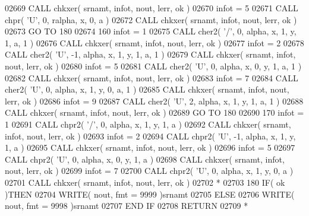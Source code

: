 \begin{DoxyCode}
02669       \textcolor{keyword}{CALL }chkxer( srnamt, infot, nout, lerr, ok )
02670       infot = 5
02671       \textcolor{keyword}{CALL }chpr( \textcolor{stringliteral}{'U'}, 0, ralpha, x, 0, a )
02672       \textcolor{keyword}{CALL }chkxer( srnamt, infot, nout, lerr, ok )
02673       \textcolor{keywordflow}{GO TO} 180
02674   160 infot = 1
02675       \textcolor{keyword}{CALL }cher2( \textcolor{stringliteral}{'/'}, 0, alpha, x, 1, y, 1, a, 1 )
02676       \textcolor{keyword}{CALL }chkxer( srnamt, infot, nout, lerr, ok )
02677       infot = 2
02678       \textcolor{keyword}{CALL }cher2( \textcolor{stringliteral}{'U'}, -1, alpha, x, 1, y, 1, a, 1 )
02679       \textcolor{keyword}{CALL }chkxer( srnamt, infot, nout, lerr, ok )
02680       infot = 5
02681       \textcolor{keyword}{CALL }cher2( \textcolor{stringliteral}{'U'}, 0, alpha, x, 0, y, 1, a, 1 )
02682       \textcolor{keyword}{CALL }chkxer( srnamt, infot, nout, lerr, ok )
02683       infot = 7
02684       \textcolor{keyword}{CALL }cher2( \textcolor{stringliteral}{'U'}, 0, alpha, x, 1, y, 0, a, 1 )
02685       \textcolor{keyword}{CALL }chkxer( srnamt, infot, nout, lerr, ok )
02686       infot = 9
02687       \textcolor{keyword}{CALL }cher2( \textcolor{stringliteral}{'U'}, 2, alpha, x, 1, y, 1, a, 1 )
02688       \textcolor{keyword}{CALL }chkxer( srnamt, infot, nout, lerr, ok )
02689       \textcolor{keywordflow}{GO TO} 180
02690   170 infot = 1
02691       \textcolor{keyword}{CALL }chpr2( \textcolor{stringliteral}{'/'}, 0, alpha, x, 1, y, 1, a )
02692       \textcolor{keyword}{CALL }chkxer( srnamt, infot, nout, lerr, ok )
02693       infot = 2
02694       \textcolor{keyword}{CALL }chpr2( \textcolor{stringliteral}{'U'}, -1, alpha, x, 1, y, 1, a )
02695       \textcolor{keyword}{CALL }chkxer( srnamt, infot, nout, lerr, ok )
02696       infot = 5
02697       \textcolor{keyword}{CALL }chpr2( \textcolor{stringliteral}{'U'}, 0, alpha, x, 0, y, 1, a )
02698       \textcolor{keyword}{CALL }chkxer( srnamt, infot, nout, lerr, ok )
02699       infot = 7
02700       \textcolor{keyword}{CALL }chpr2( \textcolor{stringliteral}{'U'}, 0, alpha, x, 1, y, 0, a )
02701       \textcolor{keyword}{CALL }chkxer( srnamt, infot, nout, lerr, ok )
02702 \textcolor{comment}{*}
02703   180 \textcolor{keywordflow}{IF}( ok )\textcolor{keywordflow}{THEN}
02704          \textcolor{keyword}{WRITE}( nout, fmt = 9999 )srnamt
02705       \textcolor{keywordflow}{ELSE}
02706          \textcolor{keyword}{WRITE}( nout, fmt = 9998 )srnamt
02707 \textcolor{keywordflow}{      END IF}
02708       \textcolor{keywordflow}{RETURN}
02709 \textcolor{comment}{*}

\end{DoxyCode}
